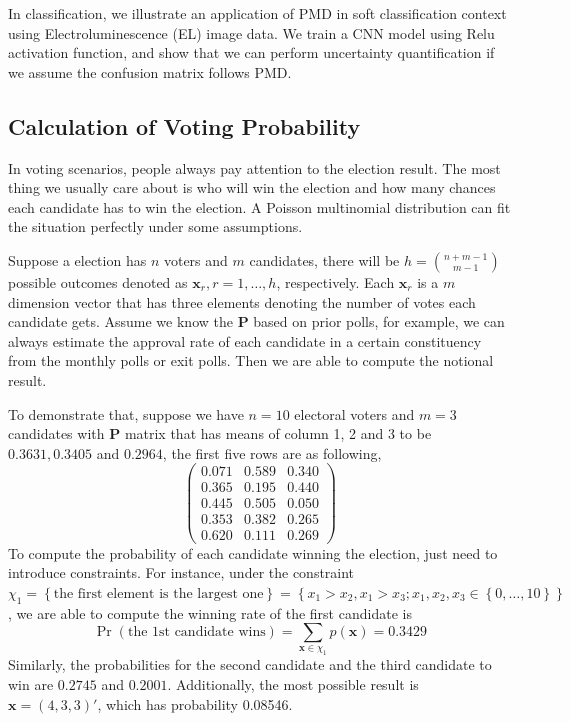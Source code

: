 \documentclass[12pt]{article}
\newcommand{\Pmat}{\mathbf{P}}
\newcommand{\PMD}{\textrm{PMD}}
\newcommand{\xvec}{\boldsymbol{x}}
\begin{document}
In classification, we illustrate an application of $\PMD$ in soft classification context using Electroluminescence (EL) image data. We train a CNN model using Relu activation function, and show that we can perform uncertainty quantification if we assume the confusion matrix follows $\PMD$.


\subsection{Calculation of Voting Probability}
In voting scenarios, people always pay attention to the election result. The most thing we usually care about is who will win the election and how many chances each candidate has to win the election. A Poisson multinomial distribution can fit the situation perfectly under some assumptions.

Suppose a election has $n$ voters and $m$ candidates, there will be $h = \binom{n+m-1}{m-1}$ possible outcomes denoted as $\xvec_r, r = 1, \dots, h$, respectively. Each $\xvec_r$ is a $m$ dimension vector that has three elements denoting the number of votes each candidate gets. Assume we know the $\Pmat$ based on prior polls, for example, we can always estimate the approval rate of each candidate in a certain constituency from the monthly polls or exit polls. Then we are able to compute the notional result.

To demonstrate that, suppose we have $n=10$ electoral voters and $m=3$ candidates with $\Pmat$ matrix that has means of column 1, 2 and 3 to be $0.3631,0.3405$ and $0.2964$, the first five rows are as following,
\begin{equation*}
\begin{pmatrix}
0.071 & 0.589 & 0.340\\
0.365 & 0.195 & 0.440\\
0.445 & 0.505 & 0.050\\
0.353 & 0.382 & 0.265\\
0.620 & 0.111 & 0.269
    \end{pmatrix}
\end{equation*}
To compute the probability of each candidate winning the election, just need to introduce constraints. For instance, under the constraint $\chi_1 = \left\{\text{the first element is the largest one}\right\} = \left\{x_1>x_2, x_1>x_3; x_1, x_2,x_3 \in \left\{0,\dots,10\right\}\right\}$, we are able to compute the winning rate of the first candidate is
\begin{equation*}
\Pr(\text{the 1st candidate wins}) = \sum_{\xvec \in \chi_{1}} p(\xvec) = 0.3429
\end{equation*}
Similarly, the probabilities for the second candidate and the third candidate to win are $0.2745$ and $0.2001$. Additionally, the most possible result is $\xvec=(4,3,3)'$, which has probability 0.08546.
\end{document}
